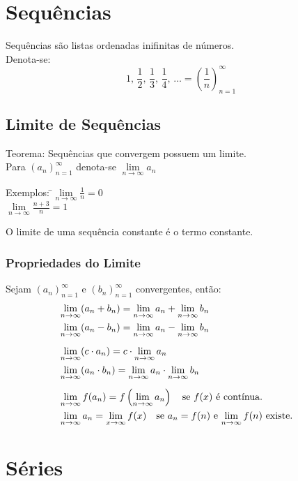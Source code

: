 \documentclass{article}
\begin{document}
\section{Sequ\^encias}

Sequ\^encias s\~ao listas ordenadas inifinitas de n\'umeros. \\
Denota-se:
\[ 1,\, \frac{1}{2},\, \frac{1}{3},\, \frac{1}{4},\, \hdots = {\left(\frac{1}{n}\right)}_{n=1}^\infty \]

\subsection{Limite de Sequ\^encias}
Teorema: Sequ\^encias que convergem possuem um limite. \\[5pt]
Para ${(a_n)}_{n=1}^\infty$ denota-se $\lim\limits_{n\to\infty} a_n$ \\[5pt]
\begin{tabbing}
  Exemplos: \=$\lim\limits_{n\to\infty} \frac{1}{n} = 0$ \\[5pt]
  \>$\lim\limits_{n\to\infty} \frac{n+3}{n} = 1$
\end{tabbing}
O limite de uma sequ\^encia constante \'e o termo constante.

\subsubsection{Propriedades do Limite}
Sejam ${(a_n)}_{n=1}^\infty$ e ${(b_n)}_{n=1}^\infty$ convergentes, ent\~ao:
\begin{align*}
  &\lim_{n\to\infty}(a_n + b_n) = \lim_{n\to\infty} a_n + \lim_{n\to\infty} b_n& \\
  &\lim_{n\to\infty}(a_n - b_n) = \lim_{n\to\infty} a_n - \lim_{n\to\infty} b_n& \\[5pt]
  &\lim_{n\to\infty}(c \cdot a_n) = c \cdot \lim_{n\to\infty} a_n& \\
  &\lim_{n\to\infty}(a_n \cdot b_n) = \lim_{n\to\infty} a_n \cdot \lim_{n\to\infty} b_n& \\[5pt]
  &\lim_{n\to\infty} f(a_n) = f\left(\lim_{n\to\infty} a_n\right) \quad \text{se $f(x)$ \'e cont\a'inua.}& \\
  &\lim_{n\to\infty} a_n = \lim_{x\to\infty} f(x) \quad \text{se $a_n = f(n)$ e $\lim_{n\to\infty} f(n)$ existe.}&
\end{align*}



\section{S\'eries}
\end{document}
